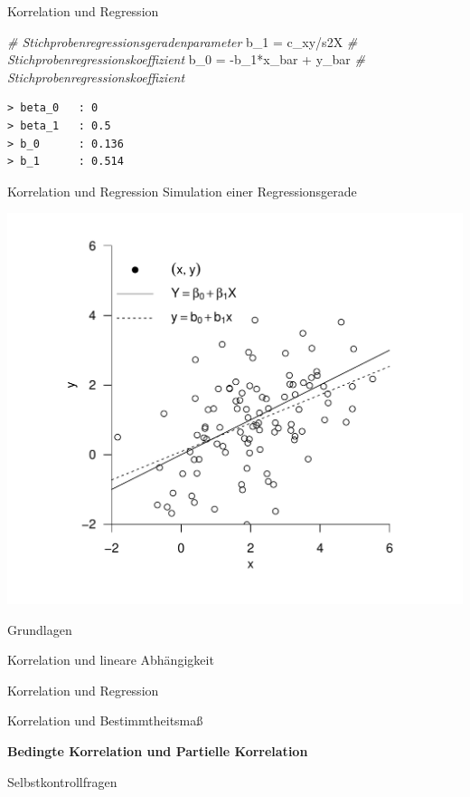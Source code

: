 \documentclass[
  8pt,
  ignorenonframetext,
]{beamer}
\newenvironment{Shaded}{\begin{snugshade}}{\end{snugshade}}
\newcommand{\CommentTok}[1]{\textcolor[rgb]{0.56,0.35,0.01}{\textit{#1}}}
\newcommand{\NormalTok}[1]{#1}
\newcommand{\OtherTok}[1]{\textcolor[rgb]{0.56,0.35,0.01}{#1}}
\newcommand{\SpecialCharTok}[1]{\textcolor[rgb]{0.00,0.00,0.00}{#1}}
\begin{document}
\begin{frame}[fragile]{Korrelation und Regression}
\begin{Shaded}
\begin{Highlighting}[]
\CommentTok{\# Stichprobenregressionsgeradenparameter}
\NormalTok{b\_1    }\OtherTok{=}\NormalTok{ c\_xy}\SpecialCharTok{/}\NormalTok{s2X                               }\CommentTok{\# Stichprobenregressionskoeffizient}
\NormalTok{b\_0    }\OtherTok{=} \SpecialCharTok{{-}}\NormalTok{b\_1}\SpecialCharTok{*}\NormalTok{x\_bar }\SpecialCharTok{+}\NormalTok{ y\_bar                     }\CommentTok{\# Stichprobenregressionskoeffizient}
\end{Highlighting}
\end{Shaded}

\begin{verbatim}
> beta_0   : 0 
> beta_1   : 0.5 
> b_0      : 0.136 
> b_1      : 0.514
\end{verbatim}
\end{frame}

\begin{frame}{Korrelation und Regression}
\protect\hypertarget{korrelation-und-regression-8}{}
Simulation einer Regressionsgerade \vspace{3mm}

\begin{center}\includegraphics[width=0.6\linewidth]{2_Abbildungen/alm_2_stichprobenregression} \end{center}
\end{frame}

\begin{frame}{}
\protect\hypertarget{section-7}{}
\vfill
\large

Grundlagen

Korrelation und lineare Abhängigkeit

Korrelation und Regression

Korrelation und Bestimmtheitsmaß

\textbf{Bedingte Korrelation und Partielle Korrelation}

Selbstkontrollfragen

\vfill
\end{frame}
\end{document}
